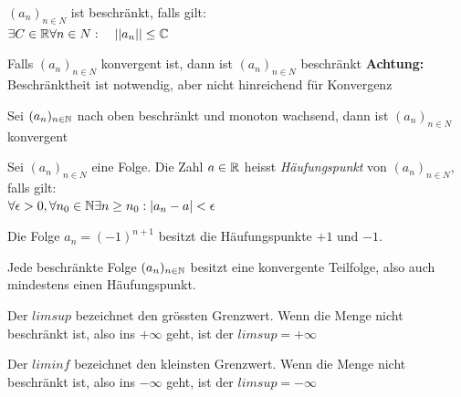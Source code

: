 \documentclass[a4paper]{article}
\begin{document}
\begin{multicols}{2}
	\begin{fdef}[beschränkt]
		$(a_n)_{n \in N}$ ist beschränkt, falls gilt:\\
		$\exists C \in \mathbb{R} \forall n \in N: \quad \vert\vert a_n \vert\vert \leq \mathbb{C}$
	\end{fdef}

	\begin{fsatz}
	\vspace{-3mm}
		Falls $(a_n)_{n\in N}$ konvergent ist, dann ist $(a_n)_{n \in
		N}$ beschränkt \textbf{Achtung:} Beschränktheit ist
		notwendig, aber nicht hinreichend für Konvergenz
	\end{fsatz}
\vspace{-5mm}
	\begin{fsatz}
	\vspace{-3mm}
		Sei $(a_n)_{n \in \mathbb{N}}$ nach oben beschränkt und monoton
		wachsend, dann ist $(a_n)_{n \in N}$ konvergent
	\end{fsatz}
\end{multicols}
\begin{multicols}{2}
	\begin{fdef}
		Sei $(a_n)_{n\in N}$ eine Folge. Die Zahl $a \in \mathbb{R}$ heisst
		\textit{Häufungspunkt} von $(a_n)_{n\in N}$, falls gilt:\\
		$\forall \epsilon > 0, \forall n_0 \in \mathbb{N} \exists n \geq n_0 : \vert a_n - a \vert < \epsilon$
	\end{fdef}
	\begin{fmerke}
		Die Folge $a_n = (-1)^{n+1}$ besitzt die Häufungspunkte $+1$ und $-1$.
	\end{fmerke}

	\begin{fsatz}
		Jede beschränkte Folge $(a_n)_{n \in \mathbb{N}}$ besitzt eine konvergente Teilfolge, also auch mindestens einen Häufungspunkt.
	\end{fsatz}
 \end{multicols}

 \begin{multicols}{2}
	\begin{fdef}
		Der $lim  sup$ bezeichnet den grössten Grenzwert. Wenn
		die Menge nicht beschränkt ist, also ins $+\infty$ geht, ist
		der $lim  sup = +\infty$
	\end{fdef}

	\begin{fdef}
		Der $lim  inf$ bezeichnet den kleinsten Grenzwert. Wenn die
		Menge nicht beschränkt ist, also ins $-\infty$ geht, ist der
		$lim  sup = -\infty$
	\end{fdef}
\end{multicols}
	
\end{document}
